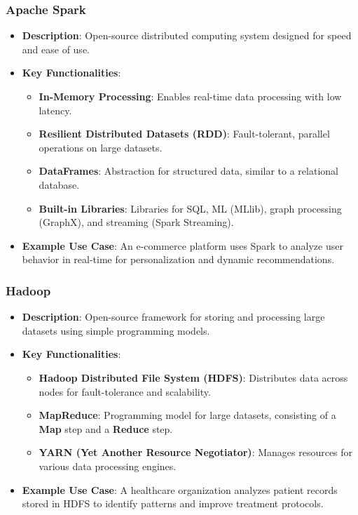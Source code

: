 \documentclass[aspectratio=169]{beamer}
\begin{document}
\begin{frame}[fragile]
    \frametitle{Apache Spark}
    \begin{itemize}
        \item \textbf{Description}: Open-source distributed computing system designed for speed and ease of use.
        \item \textbf{Key Functionalities}:
            \begin{itemize}
                \item \textbf{In-Memory Processing}: Enables real-time data processing with low latency.
                \item \textbf{Resilient Distributed Datasets (RDD)}: Fault-tolerant, parallel operations on large datasets.
                \item \textbf{DataFrames}: Abstraction for structured data, similar to a relational database.
                \item \textbf{Built-in Libraries}: Libraries for SQL, ML (MLlib), graph processing (GraphX), and streaming (Spark Streaming).
            \end{itemize}
        \item \textbf{Example Use Case}: An e-commerce platform uses Spark to analyze user behavior in real-time for personalization and dynamic recommendations.
    \end{itemize}
\end{frame}

\begin{frame}[fragile]
    \frametitle{Hadoop}
    \begin{itemize}
        \item \textbf{Description}: Open-source framework for storing and processing large datasets using simple programming models.
        \item \textbf{Key Functionalities}:
            \begin{itemize}
                \item \textbf{Hadoop Distributed File System (HDFS)}: Distributes data across nodes for fault-tolerance and scalability.
                \item \textbf{MapReduce}: Programming model for large datasets, consisting of a \textbf{Map} step and a \textbf{Reduce} step.
                \item \textbf{YARN (Yet Another Resource Negotiator)}: Manages resources for various data processing engines.
            \end{itemize}
        \item \textbf{Example Use Case}: A healthcare organization analyzes patient records stored in HDFS to identify patterns and improve treatment protocols.
    \end{itemize}
\end{frame}
\end{document}
